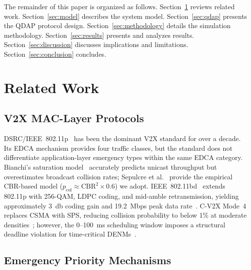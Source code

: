\documentclass[journal]{IEEEtran}
\begin{document}
The remainder of this paper is organized as follows.
Section~\ref{sec:related} reviews related work.
Section~\ref{sec:model} describes the system model.
Section~\ref{sec:qdap} presents the QDAP protocol design.
Section~\ref{sec:methodology} details the simulation methodology.
Section~\ref{sec:results} presents and analyzes results.
Section~\ref{sec:discussion} discusses implications and limitations.
Section~\ref{sec:conclusion} concludes.


\section{Related Work}
\label{sec:related}

\subsection{V2X MAC-Layer Protocols}

DSRC/IEEE~802.11p~\cite{Kenney2011,IEEE_80211p_2010} has been the dominant
V2X standard for over a decade.
Its EDCA mechanism provides four traffic classes, but the standard does not
differentiate application-layer emergency types within the same EDCA category.
Bianchi's saturation model~\cite{Bianchi2000} accurately predicts unicast
throughput but overestimates broadcast collision rates; Sepulcre
et al.~\cite{Sepulcre2011} provide the empirical CBR-based model
($p_{\text{col}} \approx \mathrm{CBR}^2 \times 0.6$) we adopt.
IEEE~802.11bd~\cite{IEEE_80211bd_2022} extends 802.11p with 256-QAM, LDPC
coding, and mid-amble retransmission, yielding approximately \SI{3}{\decibel}
coding gain and 19.2~Mbps peak data rate~\cite{Naik2019}.
C-V2X Mode~4 replaces CSMA with SPS, reducing collision probability to
below 1\% at moderate densities~\cite{Molina2017}; however, the
0–\SI{100}{\milli\second} scheduling window imposes a structural deadline
violation for time-critical DENMs~\cite{Bazzi2017,Deng2021}.

\subsection{Emergency Priority Mechanisms}
\end{document}
